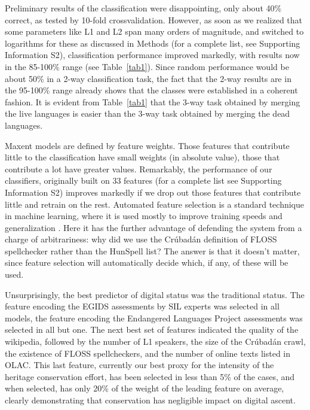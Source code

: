 \documentclass[10pt]{article}
\begin{document}
Preliminary results of the classification were disappointing, only about 40\%
correct, as tested by 10-fold crossvalidation. However, as soon as we realized
that some parameters like L1 and L2 span many orders of magnitude, and
switched to logarithms for these as discussed in Methods (for a complete list,
see Supporting Information S2), classification performance improved markedly,
with results now in the 85-100\% range (see Table~\ref{tab1}). Since random
performance would be about 50\% in a 2-way classification task, the fact that
the 2-way results are in the 95-100\% range already shows that the classes
were established in a coherent fashion.  It is evident from Table~\ref{tab1}
that the 3-way task obtained by merging the live languages is easier than the
3-way task obtained by merging the dead languages.

Maxent models are defined by feature weights. Those features that contribute
little to the classification have small weights (in absolute value), those
that contribute a lot have greater values. Remarkably, the performance of our
classifiers, originally built on 33 features (for a complete list see
Supporting Information S2) improves markedly if we drop out those features that contribute
little and retrain on the rest. {\color{black} Automated feature selection is a
  standard technique in machine learning, where it is used mostly to improve
  training speeds and generalization \cite{Pajkossy:2013}. Here it has the
  further advantage of defending the system from a charge of arbitrariness:
  why did we use the Cr\'ubad\'an definition of FLOSS spellchecker rather than
  the HunSpell list? The answer is that it doesn't matter, since feature
  selection will automatically decide which, if any, of these will be used.}

Unsurprisingly, the best predictor of digital status was the traditional
status. The feature encoding the EGIDS assessments by SIL experts was selected
in all models, the feature encoding the Endangered Languages Project
assessments was selected in all but one. The next best set of features
indicated the quality of the wikipedia, followed by the number of L1 speakers,
the size of the Cr\'ubad\'an crawl, the existence of FLOSS spellcheckers, and
the number of online texts listed in OLAC. {\color{black} This last feature,
  currently our best proxy for the intensity of the heritage conservation
  effort, has been selected in less than 5\% of the cases, and when selected, has
  only 20\% of the weight of the leading feature on average, clearly demonstrating 
  that conservation has negligible impact on digital ascent.}  
\end{document}
